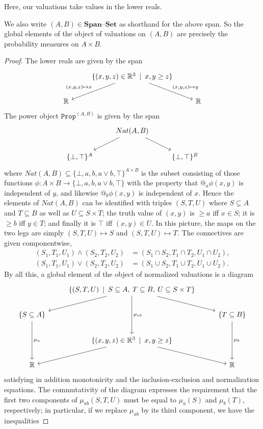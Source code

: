 \documentclass[11pt, oneside, article]{memoir}
\makeatletter
\theoremstyle{plain}
\theoremstyle{definition}
\theoremstyle{remark}
\newcommand{\const}[1]{\mathtt{#1}}
\newcommand{\Cat}[1]{\mathbf{#1}}
\newcommand{\smset}{\Cat{Set}}
\newcommand{\Prop}{\const{Prop}}
\newcommand{\AtSymbol}{{@}}
\newcommand{\At}[2][]{\AtSymbol^{#1}_{#2}}
\newcommand{\Span}{\Cat{Span}}
\newcommand{\set}{\text{--}\smset}
\makeatother
\begin{document}
Here, our valuations take values in the lower reals.

We also write $(A,B)\in\Span\set$ as shorthand for the above span. So the global elements of the object of valuations on $(A,B)$ are precisely the probability measures on $A\times B$.

\begin{proof}
The lower reals are given by the span
\[\begin{tikzcd}
	& \{ (x, y, z) \in\mathbb{R}^3 \:\mid\: x,y\geq z \} \ar[swap]{dl}{(x,y,z)\mapsto x} \ar{dr}{(x,y,z)\mapsto y} \\
	\mathbb{R} & & \mathbb{R}
\end{tikzcd}\]
The power object $\Prop^{(A,B)}$ is given by the span
\[\begin{tikzcd}
	& Nat(A,B) \ar{dl} \ar{dr} \\
	\{\bot,\top\}^A & & \{\bot,\top\}^B
\end{tikzcd}\]
where $Nat(A,B)\subseteq \{\bot,a,b,a\lor b,\top\}^{A\times B}$ is the subset consisting of those functions $\phi : A\times B \to \{\bot,a,b,a\lor b,\top\}$ with the property that $\At{a} \phi(x,y)$ is independent of $y$, and likewise $\At{b} \phi(x,y)$ is independent of $x$. Hence the elements of $Nat(A,B)$ can be identified with triples $(S,T,U)$ where $S\subseteq A$ and $T\subseteq B$ as well as $U\subseteq S\times T$; the truth value of $(x,y)$ is $\geq a$ iff $x\in S$; it is $\geq b$ iff $y\in T$; and finally it is $\top$ iff $(x,y)\in U$. In this picture, the maps on the two legs are simply $(S,T,U)\mapsto S$ and $(S,T,U)\mapsto T$. The connectives are given componentwise,
\begin{align*}
	(S_1,T_1,U_1) \land (S_2,T_2,U_2) & = (S_1\cap S_2,T_1\cap T_2,U_1\cap U_2),\\
	(S_1,T_1,U_1) \lor (S_2,T_2,U_2)  & = (S_1\cup S_2,T_1\cup T_2,U_1\cup U_2).
\end{align*}
By all this, a global element of the object of normalized valuations is a diagram
\[\begin{tikzcd}
	& \{(S,T,U) \:\mid\: S \subseteq A , \: T \subseteq B , \: U \subseteq S\times T \} \ar{dl} \ar{dr} \ar{dd}{\mu_{ab}} \\
	\{ S \subseteq A \} \ar{dd}{\mu_a} & & \{ T \subseteq B \} \ar{dd}{\mu_b} \\
	& \{ (x,y,z) \in \mathbb{R}^3 \:\mid\: x,y\geq z \} \ar{dl} \ar{dr} \\
	\mathbb{R} & & \mathbb{R}
\end{tikzcd}\]
satisfying in addition monotonicity and the inclusion-exclusion and normalization equations. The commutativity of the diagram expresses the requirement that the first two components of $\mu_{ab}(S,T,U)$ must be equal to $\mu_a(S)$ and $\mu_b(T)$, respectively; in particular, if we replace $\mu_{ab}$ by its third component, we have the inequalities

\end{proof}
\end{document}
